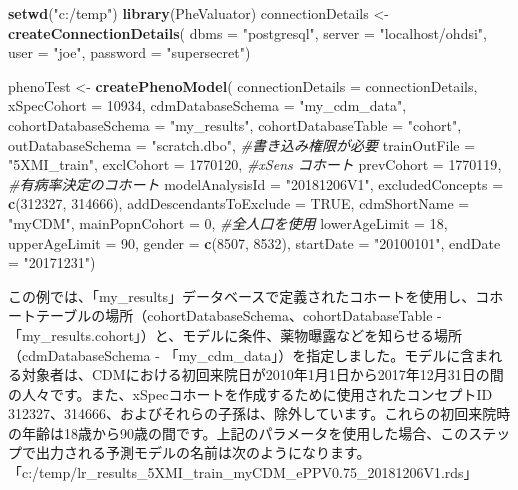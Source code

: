 \documentclass[
  11pt]{book}
\newenvironment{Shaded}{\begin{snugshade}}{\end{snugshade}}
\newcommand{\AttributeTok}[1]{\textcolor[rgb]{0.13,0.29,0.53}{#1}}
\newcommand{\CommentTok}[1]{\textcolor[rgb]{0.56,0.35,0.01}{\textit{#1}}}
\newcommand{\ConstantTok}[1]{\textcolor[rgb]{0.56,0.35,0.01}{#1}}
\newcommand{\DecValTok}[1]{\textcolor[rgb]{0.00,0.00,0.81}{#1}}
\newcommand{\FunctionTok}[1]{\textcolor[rgb]{0.13,0.29,0.53}{\textbf{#1}}}
\newcommand{\NormalTok}[1]{#1}
\newcommand{\OtherTok}[1]{\textcolor[rgb]{0.56,0.35,0.01}{#1}}
\newcommand{\StringTok}[1]{\textcolor[rgb]{0.31,0.60,0.02}{#1}}
\theoremstyle{definition}
\theoremstyle{definition}
\theoremstyle{definition}
\theoremstyle{definition}
\theoremstyle{remark}
\begin{document}
\begin{Shaded}
\begin{Highlighting}[]
\FunctionTok{setwd}\NormalTok{(}\StringTok{"c:/temp"}\NormalTok{)}
\FunctionTok{library}\NormalTok{(PheValuator)}
\NormalTok{connectionDetails }\OtherTok{\textless{}{-}} \FunctionTok{createConnectionDetails}\NormalTok{(}
  \AttributeTok{dbms =} \StringTok{"postgresql"}\NormalTok{,}
  \AttributeTok{server =} \StringTok{"localhost/ohdsi"}\NormalTok{,}
  \AttributeTok{user =} \StringTok{"joe"}\NormalTok{,}
  \AttributeTok{password =} \StringTok{"supersecret"}\NormalTok{)}

\NormalTok{phenoTest }\OtherTok{\textless{}{-}} \FunctionTok{createPhenoModel}\NormalTok{(}
  \AttributeTok{connectionDetails =}\NormalTok{ connectionDetails,}
  \AttributeTok{xSpecCohort =} \DecValTok{10934}\NormalTok{,}
  \AttributeTok{cdmDatabaseSchema =} \StringTok{"my\_cdm\_data"}\NormalTok{,}
  \AttributeTok{cohortDatabaseSchema =} \StringTok{"my\_results"}\NormalTok{,}
  \AttributeTok{cohortDatabaseTable =} \StringTok{"cohort"}\NormalTok{,}
  \AttributeTok{outDatabaseSchema =} \StringTok{"scratch.dbo"}\NormalTok{, }\CommentTok{\#書き込み権限が必要}
  \AttributeTok{trainOutFile =} \StringTok{"5XMI\_train"}\NormalTok{,}
  \AttributeTok{exclCohort =} \DecValTok{1770120}\NormalTok{, }\CommentTok{\#xSens コホート}
  \AttributeTok{prevCohort =} \DecValTok{1770119}\NormalTok{, }\CommentTok{\#有病率決定のコホート}
  \AttributeTok{modelAnalysisId =} \StringTok{"20181206V1"}\NormalTok{,}
  \AttributeTok{excludedConcepts =} \FunctionTok{c}\NormalTok{(}\DecValTok{312327}\NormalTok{, }\DecValTok{314666}\NormalTok{),}
  \AttributeTok{addDescendantsToExclude =} \ConstantTok{TRUE}\NormalTok{,}
  \AttributeTok{cdmShortName =} \StringTok{"myCDM"}\NormalTok{,}
  \AttributeTok{mainPopnCohort =} \DecValTok{0}\NormalTok{, }\CommentTok{\#全人口を使用}
  \AttributeTok{lowerAgeLimit =} \DecValTok{18}\NormalTok{,}
  \AttributeTok{upperAgeLimit =} \DecValTok{90}\NormalTok{,}
  \AttributeTok{gender =} \FunctionTok{c}\NormalTok{(}\DecValTok{8507}\NormalTok{, }\DecValTok{8532}\NormalTok{),}
  \AttributeTok{startDate =} \StringTok{"20100101"}\NormalTok{,}
  \AttributeTok{endDate =} \StringTok{"20171231"}\NormalTok{)}
\end{Highlighting}
\end{Shaded}

この例では、「my\_results」データベースで定義されたコホートを使用し、コホートテーブルの場所（cohortDatabaseSchema、cohortDatabaseTable - 「my\_results.cohort」）と、モデルに条件、薬物曝露などを知らせる場所（cdmDatabaseSchema - 「my\_cdm\_data」）を指定しました。モデルに含まれる対象者は、CDMにおける初回来院日が2010年1月1日から2017年12月31日の間の人々です。また、xSpecコホートを作成するために使用されたコンセプトID 312327、314666、およびそれらの子孫は、除外しています。これらの初回来院時の年齢は18歳から90歳の間です。上記のパラメータを使用した場合、このステップで出力される予測モデルの名前は次のようになります。「c:/temp/lr\_results\_5XMI\_train\_myCDM\_ePPV0.75\_20181206V1.rds」
\end{document}
